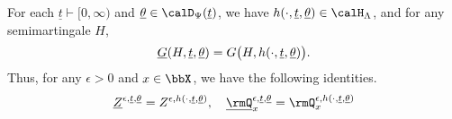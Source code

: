 \begin{theorem}
  \label{theorem:equivalence}
  For each $\underline t \vdash [0,\infty)$ and $\underline\twistVar \in \momentSpace(\underline t)$, we have $\twistFunc(\cdot,\underline t, \underline\twistVar) \in \twistSpace$, and for any semimartingale $H$,
  \begin{equation*}
    \underline{G}(H, \underline t, \underline{\theta}) = G\big(H, h(\cdot, \underline t, \underline{\theta})\big).
  \end{equation*}
  Thus, for any $\epsilon > 0$ and $\stateVar \in \stateSpace$, we have the following identities.
  \begin{equation*}
    \fddDensity^{\epsilon, \underline t, \underline\twistVar} = \mgDensity^{\epsilon, \twistFunc(\cdot, \underline t, \underline\twistVar)}, \quad 
    \fddPrb^{\epsilon, \underline t, \underline\twistVar}_\stateVar = \mgPrb^{\epsilon, \twistFunc(\cdot, \underline t, \underline\twistVar)}_\stateVar
  \end{equation*}
\end{theorem}
